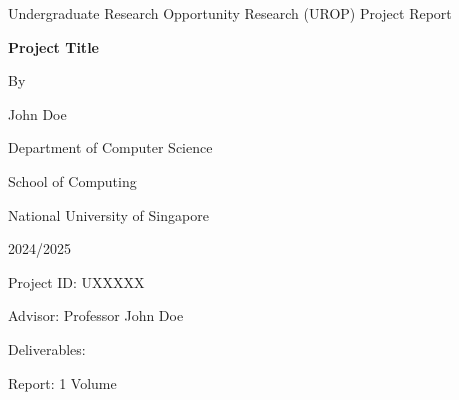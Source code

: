 \begin{titlepage}
    {\centering
    {\large Undergraduate Research Opportunity Research (UROP) Project Report}
    \vfill
    {\LARGE\bfseries Project Title\par}
    \vspace{2cm}
    {\large By\par John Doe}
    \vfill
    {\normalsize Department of Computer Science\par
    School of Computing\par
    National University of Singapore\par}
    \vspace{1cm}
    {\normalsize 2024/2025\par}
    }
    \vspace{1cm}
    Project ID: UXXXXX \par
    Advisor: Professor John Doe \par
    \vspace{1cm}
    Deliverables: \par
    \begin{list}{\quad}{}
        \item Report: 1 Volume
    \end{list}
\end{titlepage}
\restoregeometry
\pagebreak
